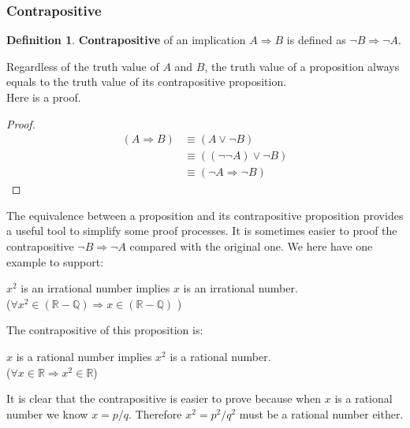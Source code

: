 \documentclass[11pt]{article}
\theoremstyle{definition}
\newtheorem{defn}{Definition}[subsection]
\begin{document}
\subsubsection{Contrapositive}
\begin{shaded}
    \begin{defn}
        \textbf{Contrapositive} of an implication $A \Rightarrow B$ is defined as $\neg B \Rightarrow \neg A$. 
    \end{defn}
\end{shaded}
Regardless of the truth value of $A$ and $B$, the truth value of a proposition always equals to the truth value of its contrapositive proposition.\\
Here is a proof.
\begin{proof}
    \begin{equation}
        \begin{split}
            (A \Rightarrow B) & \equiv (A \vee \neg B)\\
                              & \equiv ((\neg \neg A) \vee \neg B)\\
                              & \equiv (\neg A \Rightarrow \neg B)
        \end{split}
    \end{equation}
\end{proof}
The equivalence between a proposition and its contrapositive proposition provides a useful tool to simplify some proof processes. It is sometimes easier to proof the contrapositive $\neg B \Rightarrow \neg A$ compared with the original one. We here have one example to support:
\begin{center}
    $x^2$ is an irrational number implies $x$ is an irrational number.\\
    (\textit{$\forall x^2 \in (\mathbb{R} - \mathbb{Q}) \Rightarrow x \in (\mathbb{R} - \mathbb{Q})$ })
\end{center}

The contrapositive of this proposition is:
\begin{center}
    $x$ is a rational number implies $x^2$ is a rational number.\\
    (\textit{$\forall x \in \mathbb{R} \Rightarrow x^2 \in \mathbb{R}$})
\end{center}

It is clear that the contrapositive is easier to prove because when $x$ is a rational number we know $x=p/q$. Therefore $x^2=p^2/q^2$ must be a rational number either.
\end{document}
